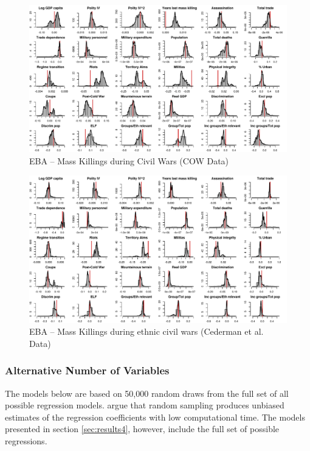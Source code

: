 \clearpage
\begin{figure}
    \centering
    \includegraphics[width=\textwidth]{images/mk-cow.pdf}
    \caption{EBA -- Mass Killings during Civil Wars (COW Data)}
    \label{fig:mk-cow}
\end{figure}
\clearpage

\clearpage
\begin{figure}
    \centering
    \includegraphics[width=\textwidth]{images/mk-eth.pdf}
    \caption{EBA -- Mass Killings during ethnic civil wars (Cederman et al. Data)}
    \label{fig:mk-eth}
\end{figure}
\clearpage

\subsubsection{Alternative Number of Variables}

The models below are based on 50,000 random draws from the full set of all possible regression models. \citet[819]{salaimartin2004determinants} argue that random sampling produces unbiased estimates of the regression coefficients with low computational time. The models presented in section \ref{sec:results4}, however, include the full set of possible regressions.

